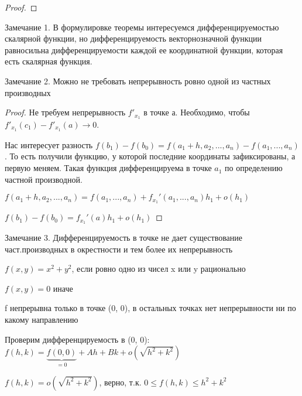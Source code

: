 \begin{theorem}
\begin{proof}
    \end{proof}

    \item Замечание 1. В формулировке теоремы интересуемся дифференцируемостью скалярной функции, но дифференцируемость векторнозначной функции равносильна дифференцируемости каждой ее координатной функции, которая есть скалярная функция.

    \item Замечание 2. Можно не требовать непрерывность ровно одной из частных производных
	\begin{proof} \thmslashn

	Не требуем непрерывность $f'_{x_1}$ в точке а. Необходимо, чтобы $f'_{x_1}(c_1) - f'_{x_1}(a) \to 0$.

	Нас интересует разность $f(b_1) - f(b_0) = f(a_1 + h, a_2, ..., a_n) - f(a_1, ..., a_n)$. То есть получили функцию, у которой последние координаты зафиксированы, а первую меняем. Такая функция дифференцируема в точке $a_1$ по определению частной производной.

	$f(a_1 + h, a_2, ..., a_n) = f(a_1, ..., a_n) + f_{x_1}'(a_1, ..., a_n)h_1 + o(h_1)$

	$f(b_1) - f(b_0) = f_{x_1}'(a)h_1 + o(h_1)$
	\end{proof}
    \item Замечание 3. Дифференцируемость в точке не дает существование част.производных в окрестности и тем более их непрерывность
	\begin{example} \thmslashn

	$f(x, y) = x^2 + y^2$, если ровно одно из чисел x или y рационально

	$f(x, y) = 0$ иначе 

	f непрерывна только в точке (0, 0), в остальных точках нет непрерывности ни по какому направлению

	Проверим дифференцируемость в (0, 0): $f(h, k) = \underbrace{f(0, 0)}_{=0} + Ah + Bk + o(\sqrt{h^2 + k^2})$

	$f(h, k) = o(\sqrt{h^2 + k^2})$, верно, т.к. $0 \le f(h, k) \le h^2 + k^2$
	\end{example}

\end{theorem}


